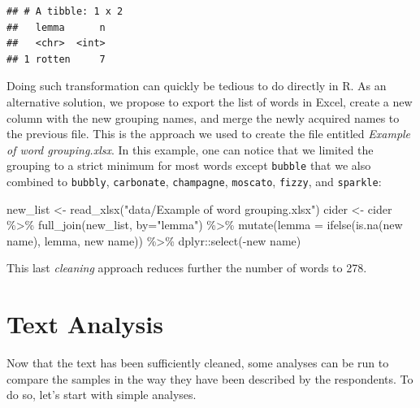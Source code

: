 \documentclass[
]{krantz}
\makeatletter
\newenvironment{Shaded}{\begin{snugshade}}{\end{snugshade}}
\newcommand{\AttributeTok}[1]{\textcolor[rgb]{0.61,0.61,0.61}{#1}}
\newcommand{\FunctionTok}[1]{\textcolor[rgb]{0,0,0}{#1}}
\newcommand{\NormalTok}[1]{#1}
\newcommand{\OtherTok}[1]{\textcolor[rgb]{0.37,0.37,0.37}{#1}}
\newcommand{\SpecialCharTok}[1]{\textcolor[rgb]{0,0,0}{#1}}
\newcommand{\StringTok}[1]{\textcolor[rgb]{0.5,0.5,0.5}{#1}}
\newenvironment{kframe}{%
\medskip{}
\setlength{\fboxsep}{.8em}
 \def\at@end@of@kframe{}%
 \ifinner\ifhmode%
  \def\at@end@of@kframe{\end{minipage}}%
  \begin{minipage}{\columnwidth}%
 \fi\fi%
 \def\FrameCommand##1{\hskip\@totalleftmargin \hskip-\fboxsep
 \colorbox{shadecolor}{##1}\hskip-\fboxsep
     \hskip-\linewidth \hskip-\@totalleftmargin \hskip\columnwidth}%
 \MakeFramed {\advance\hsize-\width
   \@totalleftmargin\z@ \linewidth\hsize
   \@setminipage}}%
 {\par\unskip\endMakeFramed%
 \at@end@of@kframe}
\renewenvironment{Shaded}{\begin{kframe}}{\end{kframe}}
\makeatother
\begin{document}
\begin{verbatim}
## # A tibble: 1 x 2
##   lemma      n
##   <chr>  <int>
## 1 rotten     7
\end{verbatim}

Doing such transformation can quickly be tedious to do directly in R. As an alternative solution, we propose to export the list of words in Excel, create a new column with the new grouping names, and merge the newly acquired names to the previous file. This is the approach we used to create the file entitled \emph{Example of word grouping.xlsx}. In this example, one can notice that we limited the grouping to a strict minimum for most words except \texttt{bubble} that we also combined to \texttt{bubbly}, \texttt{carbonate}, \texttt{champagne}, \texttt{moscato}, \texttt{fizzy}, and \texttt{sparkle}:

\begin{Shaded}
\begin{Highlighting}[]
\NormalTok{new\_list }\OtherTok{\textless{}{-}} \FunctionTok{read\_xlsx}\NormalTok{(}\StringTok{"data/Example of word grouping.xlsx"}\NormalTok{)}
\NormalTok{cider }\OtherTok{\textless{}{-}}\NormalTok{ cider }\SpecialCharTok{\%\textgreater{}\%} 
  \FunctionTok{full\_join}\NormalTok{(new\_list, }\AttributeTok{by=}\StringTok{"lemma"}\NormalTok{) }\SpecialCharTok{\%\textgreater{}\%} 
  \FunctionTok{mutate}\NormalTok{(}\AttributeTok{lemma =} \FunctionTok{ifelse}\NormalTok{(}\FunctionTok{is.na}\NormalTok{(}\StringTok{\textasciigrave{}}\AttributeTok{new name}\StringTok{\textasciigrave{}}\NormalTok{), lemma, }\StringTok{\textasciigrave{}}\AttributeTok{new name}\StringTok{\textasciigrave{}}\NormalTok{)) }\SpecialCharTok{\%\textgreater{}\%} 
\NormalTok{  dplyr}\SpecialCharTok{::}\FunctionTok{select}\NormalTok{(}\SpecialCharTok{{-}}\StringTok{\textasciigrave{}}\AttributeTok{new name}\StringTok{\textasciigrave{}}\NormalTok{)}
\end{Highlighting}
\end{Shaded}

This last \emph{cleaning} approach reduces further the number of words to 278.

\hypertarget{text-analysis-1}{%
\section{Text Analysis}\label{text-analysis-1}}

Now that the text has been sufficiently cleaned, some analyses can be run to compare the samples in the way they have been described by the respondents. To do so, let's start with simple analyses.
\end{document}
